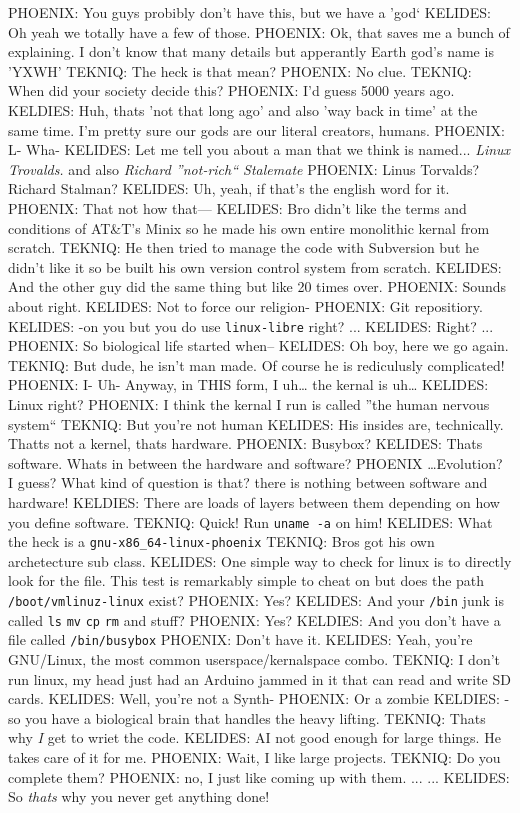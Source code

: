 

PHOENIX: You guys probibly don't have this, but we have a 'god`
KELIDES: Oh yeah we totally have a  few of those.
PHOENIX: Ok, that saves me a bunch of explaining. I don't know that many details but apperantly Earth god's name is 'YXWH'
TEKNIQ: The heck is that mean?
PHOENIX: No clue.
TEKNIQ: When did your society decide this?
PHOENIX: I'd guess 5000 years ago.
KELDIES: Huh, thats 'not that long ago' and also 'way back in time' at the same time. I'm pretty sure our gods are our literal creators, humans.
PHOENIX: L- Wha-
KELIDES: Let me tell you about a man that we think is named... \emph{Linux Trovalds.} and also \emph{Richard ''not-rich`` Stalemate}
PHOENIX: Linus Torvalds? Richard Stalman?
KELIDES: Uh, yeah, if that's the english word for it.
PHOENIX: That not how that---
KELIDES: Bro didn't like the terms and conditions of AT&T's Minix so he made his
own entire monolithic kernal from scratch.
TEKNIQ: He then tried to manage the code with Subversion but he didn't like it so be built his own version control system from scratch.
KELIDES: And the other guy did the same thing but like 20 times over.
PHOENIX: Sounds about right.
KELIDES: Not to force our religion-
PHOENIX: Git repositiory.
KELIDES: -on you but you do use \texttt{linux-libre} right?
...
KELIDES: Right?
...
PHOENIX: So biological life started when--
KELIDES: Oh boy, here we go again.
TEKNIQ: But dude, he isn't man made. Of course he is rediculusly complicated!
PHOENIX: I- Uh- Anyway, in THIS form, I uh\ldots{} the kernal is uh\ldots{}
KELIDES: Linux right?
PHOENIX: I think the kernal I run is called ''the human nervous system``
TEKNIQ: But you're not human
KELIDES: His insides are, technically. Thatts not a kernel, thats hardware.
PHOENIX: Busybox?
KELIDES: Thats software. Whats in between the hardware and software?
PHOENIX \ldots Evolution? I guess? What kind of question is that? there is nothing between software and hardware!
KELDIES: There are loads of layers between them depending on how you define software.
TEKNIQ: Quick! Run \texttt{uname -a} on him!
KELIDES: What the heck is a \texttt{gnu-x86_64-linux-phoenix}
TEKNIQ: Bros got his own archetecture sub class.
KELIDES: One simple way to check for linux is to directly look for the file. This test is remarkably simple to cheat on but does the path \texttt{/boot/vmlinuz-linux} exist?
PHOENIX: Yes?
KELIDES: And your \texttt{/bin} junk is called \texttt{ls} \texttt{mv} \texttt{cp} \texttt{rm} and stuff?
PHOENIX: Yes?
KELDIES: And you don't have a file called \texttt{/bin/busybox}
PHOENIX: Don't have it.
KELIDES: Yeah, you're GNU/Linux, the most common userspace/kernalspace combo.
TEKNIQ: I don't run linux, my head just had an Arduino jammed in it that can read and write SD cards.
KELIDES: Well, you're not a Synth-
PHOENIX: Or a zombie
KELDIES: -so you have a biological brain that handles the heavy lifting.
TEKNIQ: Thats why \emph{I} get to wriet the code.
KELIDES: AI not good enough for large things. He takes care of it for me.
PHOENIX: Wait, I like large projects.
TEKNIQ: Do you complete them?
PHOENIX: no, I just like coming up with them.
...
...
KELIDES: So \emph{thats} why you never get anything done!

